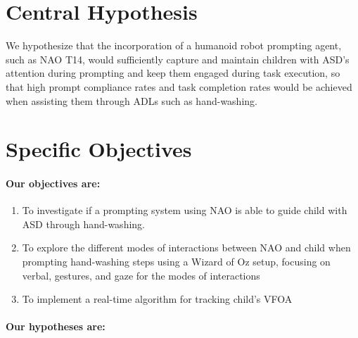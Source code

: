 \documentclass{ut-thesis}
\begin{document}
\section{Central Hypothesis}
We hypothesize that the incorporation of a humanoid robot prompting agent, such as NAO T14, would sufficiently capture and maintain children with ASD's attention during prompting and keep them engaged during task execution, so that high prompt compliance rates and task completion rates would be achieved when assisting them through ADLs such as hand-washing.


\section{Specific Objectives}

\paragraph{Our objectives are:}
\begin{enumerate}
	\item To investigate if a prompting system using NAO is able to guide child with ASD through hand-washing.

	\item To explore the different modes of interactions between NAO and child when prompting hand-washing steps using a Wizard of Oz setup, focusing on verbal, gestures, and gaze for the modes of interactions

	\item To implement a real-time algorithm for tracking child's VFOA
\end{enumerate}



\paragraph{Our hypotheses are:}





\end{document}
